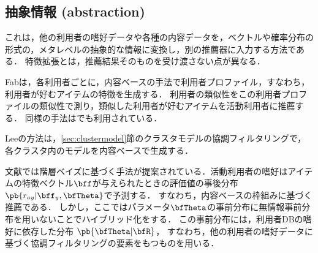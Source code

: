 
\subsection{抽象情報 (abstraction)}

これは，他の利用者の嗜好データや各種の内容データを，ベクトルや確率分布の形式の，メタレベルの抽象的な情報に変換し，別の推薦器に入力する方法である．
特徴拡張とは，推薦結果そのものを受け渡さない点が異なる．

Fab\cite{macm:97:02}は，各利用者ごとに，内容ベースの手法で利用者プロファイル，すなわち，利用者が好むアイテムの特徴を生成する．
利用者の類似性をこの利用者プロファイルの類似性で測り，類似した利用者が好むアイテムを活動利用者に推薦する．
同様の手法は\cite{ej:050}でも利用されている．

Leeの方法\cite{icml:01:01}は，\ref{sec:clustermodel}節のクラスタモデルの協調フィルタリングで，各クラスタ内のモデルを内容ベースで生成する．

文献\cite{uai:03:03}では階層ベイズに基づく手法が提案されている．活動利用者の嗜好はアイテムの特徴ベクトル$\bff$が与えられたときの評価値の事後分布$\pb{r_{ay}|\bff_y,\bfTheta}$で予測する．
すなわち，内容ベースの枠組みに基づく推薦である．
しかし，ここではパラメータ$\bfTheta$の事前分布に無情報事前分布を用いないことでハイブリッド化をする．
この事前分布には，利用者DBの嗜好に依存した分布 $\pb{\bfTheta|\bfR}$，
すなわち，他の利用者の嗜好データに基づく協調フィルタリングの要素をもつものを用いる．

